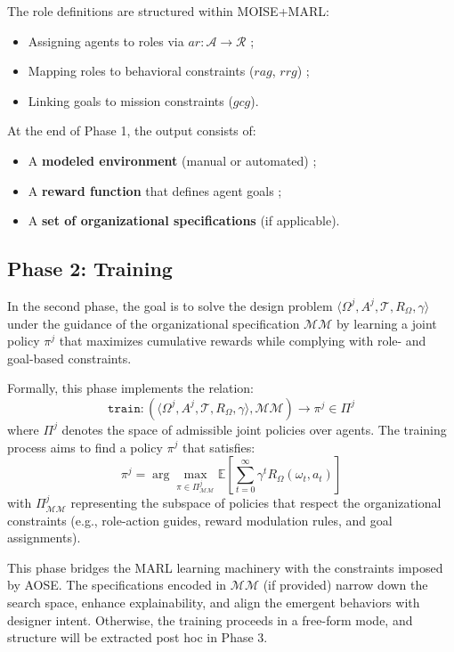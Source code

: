 \documentclass[pdflatex,sn-mathphys-num]{sn-jnl}%
\theoremstyle{thmstyleone}%
\theoremstyle{thmstyletwo}%
\theoremstyle{thmstylethree}%
\begin{document}
The role definitions are structured within MOISE+MARL:
\begin{itemize}
    \item Assigning agents to roles via $ar: \mathcal{A} \to \mathcal{R}$ ;
    \item Mapping roles to behavioral constraints ($rag$, $rrg$) ;
    \item Linking goals to mission constraints ($gcg$).
\end{itemize}

At the end of Phase 1, the output consists of:
\begin{itemize}
    \item A \textbf{modeled environment} (manual or automated) ;
    \item A \textbf{reward function} that defines agent goals ;
    \item A \textbf{set of organizational specifications} (if applicable).
\end{itemize}

\subsection{Phase 2: Training}

In the second phase, the goal is to solve the design problem $\langle \Omega^j, A^j, \mathcal{T}, R_{\Omega}, \gamma \rangle$ under the guidance of the organizational specification $\mathcal{MM}$ by learning a joint policy $\pi^j$ that maximizes cumulative rewards while complying with role- and goal-based constraints.

Formally, this phase implements the relation:
\[
    \texttt{train}: \left( \langle \Omega^j, A^j, \mathcal{T}, R_{\Omega}, \gamma \rangle, \mathcal{MM} \right) \longrightarrow \pi^j \in \Pi^j
\]
where $\Pi^j$ denotes the space of admissible joint policies over agents. The training process aims to find a policy $\pi^j$ that satisfies:
\[
    \pi^j = \arg\max_{\pi \in \Pi^j_{\mathcal{MM}}} \mathbb{E} \left[ \sum_{t=0}^{\infty} \gamma^t R_{\Omega}(\omega_t, a_t) \right]
\]
with $\Pi^j_{\mathcal{MM}}$ representing the subspace of policies that respect the organizational constraints (e.g., role-action guides, reward modulation rules, and goal assignments).

This phase bridges the MARL learning machinery with the constraints imposed by AOSE. The specifications encoded in $\mathcal{MM}$ (if provided) narrow down the search space, enhance explainability, and align the emergent behaviors with designer intent. Otherwise, the training proceeds in a free-form mode, and structure will be extracted post hoc in Phase 3.
\end{document}
